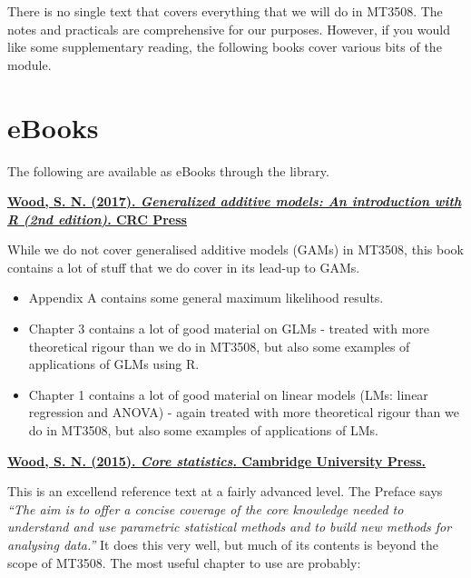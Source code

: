 \documentclass[
  openany]{book}
\providecommand{\tightlist}{%
  \setlength{\itemsep}{0pt}\setlength{\parskip}{0pt}}
\begin{document}
There is no single text that covers everything that we will do in MT3508. The notes and practicals are comprehensive for our purposes. However, if you would like some supplementary reading, the following books cover various bits of the module.

\hypertarget{ebooks}{%
\section*{eBooks}\label{ebooks}}

The following are available as eBooks through the library.

\href{https://encore.st-andrews.ac.uk/iii/encore/record/C__Rb2496019__SGeneralized\%20additive\%20models\%3A\%20An\%20introduction\%20with\%20R__Orightresult__U__X4?lang=eng\&suite=def}{\textbf{Wood, S. N. (2017). \emph{Generalized additive models: An introduction with R (2nd edition)}. CRC Press}}

While we do not cover generalised additive models (GAMs) in MT3508, this book contains a lot of stuff that we do cover in its lead-up to GAMs.

\begin{itemize}
\tightlist
\item
  Appendix A contains some general maximum likelihood results.
\item
  Chapter 3 contains a lot of good material on GLMs - treated with more theoretical rigour than we do in MT3508, but also some examples of applications of GLMs using R.
\item
  Chapter 1 contains a lot of good material on linear models (LMs: linear regression and ANOVA) - again treated with more theoretical rigour than we do in MT3508, but also some examples of applications of LMs.
\end{itemize}

\href{https://encore.st-andrews.ac.uk/iii/encore/record/C__Rb3040989__SCore\%20statistics__Orightresult__U__X7?lang=eng\&suite=def}{\textbf{Wood, S. N. (2015). \emph{Core statistics}. Cambridge University Press.}}

This is an excellend reference text at a fairly advanced level. The Preface says \emph{``The aim is to offer a concise coverage of the core knowledge needed to understand and use parametric statistical methods and to build new methods for analysing data.''} It does this very well, but much of its contents is beyond the scope of MT3508. The most useful chapter to use are probably:
\end{document}
